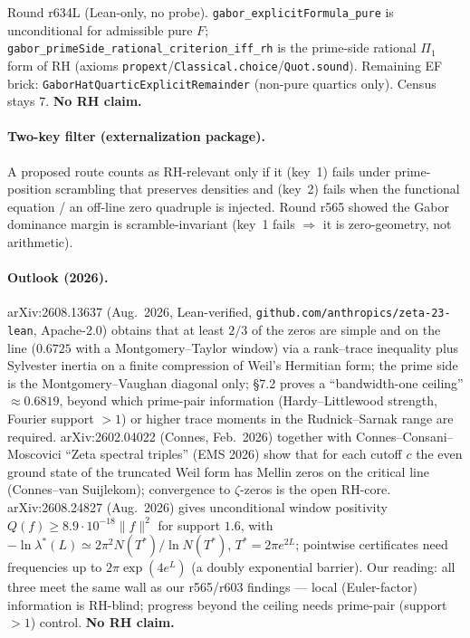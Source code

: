 \documentclass[11pt]{article}
\theoremstyle{definition}
\theoremstyle{remark}
\begin{document}
\noindent Round r634L (Lean-only, no probe).
\texttt{gabor\_explicitFormula\_pure} is unconditional for
admissible pure $F$;
\texttt{gabor\_primeSide\_rational\_criterion\_iff\_rh} is the
prime-side rational $\Pi_1$ form of RH (axioms
\texttt{propext}/\texttt{Classical.choice}/\texttt{Quot.sound}).
Remaining EF brick: \texttt{GaborHatQuarticExplicitRemainder}
(non-pure quartics only).  Census stays $7$.
\textbf{No RH claim.}

\paragraph{Two-key filter (externalization package).}
A proposed route counts as RH-relevant only if it (key~1) fails under
prime-position scrambling that preserves densities and (key~2) fails when
the functional equation / an off-line zero quadruple is injected.
Round r565 showed the Gabor dominance margin is scramble-invariant
(key~1 fails $\Rightarrow$ it is zero-geometry, not arithmetic).

\paragraph{Outlook (2026).}
arXiv:2608.13637 (Aug.~2026, Lean-verified,
\texttt{github.com/anthropics/zeta-23-lean}, Apache-2.0) obtains that at
least $2/3$ of the zeros are simple and on the line ($0.6725$ with a
Montgomery--Taylor window) via a rank--trace inequality plus Sylvester
inertia on a finite compression of Weil's Hermitian form; the prime side
is the Montgomery--Vaughan diagonal only; \S7.2 proves a
``bandwidth-one ceiling'' $\approx 0.6819$, beyond which prime-pair
information (Hardy--Littlewood strength, Fourier support $>1$) or higher
trace moments in the Rudnick--Sarnak range are required.
arXiv:2602.04022 (Connes, Feb.~2026) together with Connes--Consani--Moscovici
``Zeta spectral triples'' (EMS 2026) show that for each cutoff $c$ the
even ground state of the truncated Weil form has Mellin zeros on the
critical line (Connes--van Suijlekom); convergence to $\zeta$-zeros is
the open RH-core.
arXiv:2608.24827 (Aug.~2026) gives unconditional window positivity
$Q(f)\ge 8.9\cdot 10^{-18}\|f\|^2$ for support $1.6$, with
$-\ln\lambda^*(L)\simeq 2\pi^2 N(T^*)/\ln N(T^*)$,
$T^*=2\pi e^{2L}$; pointwise certificates need frequencies up to
$2\pi\exp(4e^L)$ (a doubly exponential barrier).
Our reading: all three meet the same wall as our r565/r603 findings ---
local (Euler-factor) information is RH-blind; progress beyond the ceiling
needs prime-pair (support $>1$) control.
\textbf{No RH claim.}
\end{document}

